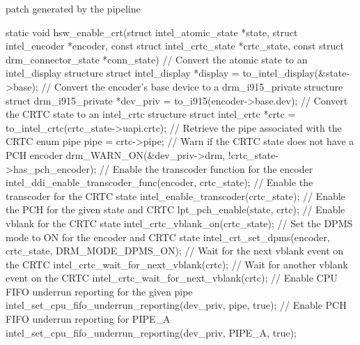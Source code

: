 patch generated by the pipeline 
\begin{lightcpp}
    static void hsw_enable_crt(struct intel_atomic_state *state,
struct intel_encoder *encoder,
const struct intel_crtc_state *crtc_state,
const struct drm_connector_state *conn_state)
{
// Convert the atomic state to an intel_display structure
struct intel_display *display = to_intel_display(&state->base);
// Convert the encoder's base device to a drm_i915_private structure
struct drm_i915_private *dev_priv = to_i915(encoder->base.dev);
// Convert the CRTC state to an intel_crtc structure
struct intel_crtc *crtc = to_intel_crtc(crtc_state->uapi.crtc);
// Retrieve the pipe associated with the CRTC
enum pipe pipe = crtc->pipe;
// Warn if the CRTC state does not have a PCH encoder
drm_WARN_ON(&dev_priv->drm, !crtc_state->has_pch_encoder);
// Enable the transcoder function for the encoder
intel_ddi_enable_transcoder_func(encoder, crtc_state);
// Enable the transcoder for the CRTC state
intel_enable_transcoder(crtc_state);
// Enable the PCH for the given state and CRTC
lpt_pch_enable(state, crtc);
// Enable vblank for the CRTC state
intel_crtc_vblank_on(crtc_state);
// Set the DPMS mode to ON for the encoder and CRTC state
intel_crt_set_dpms(encoder, crtc_state, DRM_MODE_DPMS_ON);
// Wait for the next vblank event on the CRTC
intel_crtc_wait_for_next_vblank(crtc);
// Wait for another vblank event on the CRTC
intel_crtc_wait_for_next_vblank(crtc);
// Enable CPU FIFO underrun reporting for the given pipe
intel_set_cpu_fifo_underrun_reporting(dev_priv, pipe, true);
// Enable PCH FIFO underrun reporting for PIPE_A
intel_set_cpu_fifo_underrun_reporting(dev_priv, PIPE_A, true);
}
\end{lightcpp}
